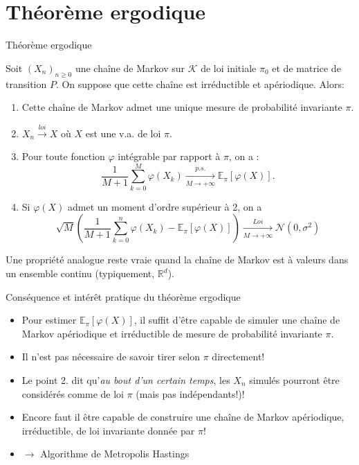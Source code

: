 \documentclass[9pt,ignorenonframetext,]{beamer}
\providecommand{\tightlist}{%
  \setlength{\itemsep}{0pt}\setlength{\parskip}{0pt}}
\newcommand{\R}{\mathbb{R}}
\newcommand{\K}{\mathcal{K}}
\begin{document}
\hypertarget{thuxe9oruxe8me-ergodique}{%
\section{Théorème ergodique}\label{thuxe9oruxe8me-ergodique}}

\begin{frame}{Théorème ergodique}
\protect\hypertarget{thuxe9oruxe8me-ergodique-1}{}

Soit \((X_n)_{n\geq 0}\) une chaîne de Markov sur \(\K\) de loi initiale
\(\pi_0\) et de matrice de transition \(P\). On suppose que cette chaîne
est irréductible et apériodique. Alors: \pause

\begin{enumerate}
\tightlist
\item
  Cette chaîne de Markov admet une unique mesure de probabilité
  invariante \(\pi\). \pause
\item
  \(X_n \overset{loi}{\longrightarrow} X\) où \(X\) est une v.a. de loi
  \(\pi\).\pause
\item
  Pour toute fonction \(\varphi\) intégrable par rapport à \(\pi\), on a
  :
  \[\frac{1}{M + 1} \sum_{k = 0}^M \varphi(X_k) \underset{M \rightarrow +\infty}{\overset{p.s.}{\longrightarrow}} \mathbb{E}_\pi[\varphi(X)].\]
  \pause
\item
  Si \(\varphi(X)\) admet un moment d'ordre supérieur à 2, on a
  \[\sqrt{M}\left( \frac{1}{M + 1}\sum_{k = 0}^n \varphi(X_k) - \mathbb{E}_\pi[\varphi(X)] \right) \underset{M \rightarrow +\infty}{\overset{Loi}{\longrightarrow}} \mathcal{N}(0, \sigma^2)\]
\end{enumerate}

\pause

Une propriété analogue reste vraie quand la chaîne de Markov est à
valeurs dans un ensemble continu (typiquement, \(\R^d\)).

\end{frame}

\begin{frame}{Conséquence et intérêt pratique du théorème ergodique}
\protect\hypertarget{consuxe9quence-et-intuxe9ruxeat-pratique-du-thuxe9oruxe8me-ergodique}{}

\begin{itemize}
\tightlist
\item
  Pour estimer \(\mathbb{E}_\pi[\varphi(X)]\), il suffit d'être capable
  de simuler une chaîne de Markov apériodique et irréductible de mesure
  de probabilité invariante \(\pi\).\pause 
\item
  Il n'est pas nécessaire de savoir tirer selon \(\pi\) directement!
  \pause
\item
  Le point 2. dit qu'\emph{au bout d'un certain temps}, les \(X_n\)
  simulés pourront être considérés comme de loi \(\pi\) (mais pas
  indépendants!)! \pause
\item
  Encore faut il être capable de construire une chaîne de Markov
  apériodique, irréductible, de loi invariante donnée par \(\pi\)!\pause
\item
  \(\longrightarrow\) Algorithme de Metropolis Hastings
\end{itemize}

\end{frame}
\end{document}
